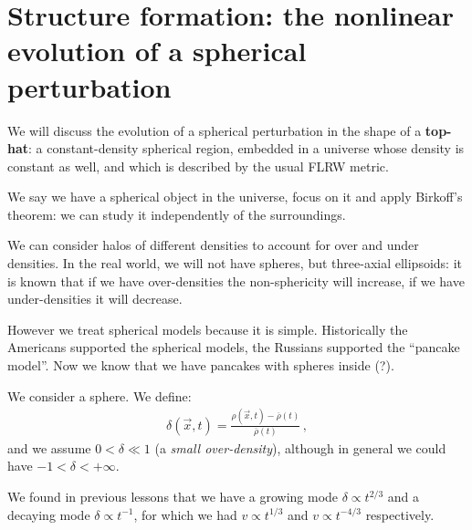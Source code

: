 \documentclass[main.tex]{subfiles}
\begin{document}





\section{Structure formation: the nonlinear evolution of a spherical perturbation}

We will discuss the evolution of a spherical perturbation in the shape of a \textbf{top-hat}: a constant-density spherical region, embedded in a universe whose density is constant as well, and which is described by the usual FLRW metric. 

We say we have a spherical object in the universe, focus on it and apply Birkoff's theorem: we can study it independently of the surroundings. 

We can consider halos of different densities to account for over and under densities. 
In the real world, we will not have spheres, but three-axial ellipsoids: it is known that if we have over-densities the non-sphericity will increase, if we have under-densities it will decrease. 

However we treat spherical models because it is simple.
Historically the Americans supported the spherical models, the Russians supported the ``pancake model''. 
Now we know that we have pancakes with spheres inside (?). 

We consider a sphere. We define: 
%
\begin{align}
\delta (\vec{x}, t) = \frac{\rho (\vec{x}, t) - \overline{\rho}(t)}{\overline{\rho}(t)} 
\,,
\end{align}
%
and we assume \(0<\delta \ll 1\) (a \emph{small over-density}), although in general we could have \(-1 < \delta < + \infty \). 

We found in previous lessons that we have a growing mode \(\delta \propto t^{2/3}\) and a decaying mode \(\delta \propto t^{-1}\), for which we had \(v \propto t^{1/3} \) and \(v \propto t^{-4/3}\) respectively. 
\end{document}
